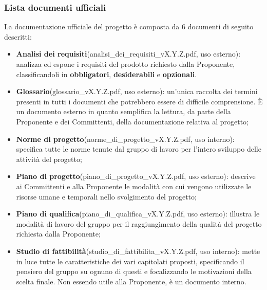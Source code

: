 	\subsubsection{Lista documenti ufficiali}
	La documentazione ufficiale del progetto è composta da 6 documenti di seguito descritti:
	\begin{itemize}
		\item \textbf{Analisi dei requisiti}(analisi\_dei\_requisiti\_vX.Y.Z.pdf, uso esterno): analizza ed espone i requisiti del prodotto richiesto dalla Proponente, classificandoli in \textbf{obbligatori}, \textbf{desiderabili} e \textbf{opzionali}.
		\item \textbf{Glossario}(glossario\_vX.Y.Z.pdf, uso esterno): un'unica raccolta dei termini presenti in tutti i documenti che potrebbero essere di difficile comprensione. È un documento esterno in quanto semplifica la lettura, da parte della Proponente e dei Committenti, della documentazione relativa al progetto;
		\item \textbf{Norme di progetto}(norme\_di\_progetto\_vX.Y.Z.pdf, uso interno): specifica tutte le norme tenute dal gruppo di lavoro per l'intero sviluppo delle attività del progetto;
		\item \textbf{Piano di progetto}(piano\_di\_progetto\_vX.Y.Z.pdf, uso esterno): descrive ai Committenti e alla Proponente le modalità con cui vengono utilizzate le risorse umane e temporali nello svolgimento del progetto;
		\item \textbf{Piano di qualifica}(piano\_di\_qualifica\_vX.Y.Z.pdf, uso esterno): illustra le modalità di lavoro del gruppo per il raggiungimento della qualità del progetto richiesta dalla Proponente;
		\item \textbf{Studio di fattibilità}(studio\_di\_fattibilita\_vX.Y.Z.pdf, uso interno): mette in luce tutte le caratteristiche dei vari capitolati proposti, specificando il pensiero del gruppo su ognuno di questi e focalizzando le motivazioni della scelta finale. Non essendo utile alla Proponente, è un documento interno.
	\end{itemize}

